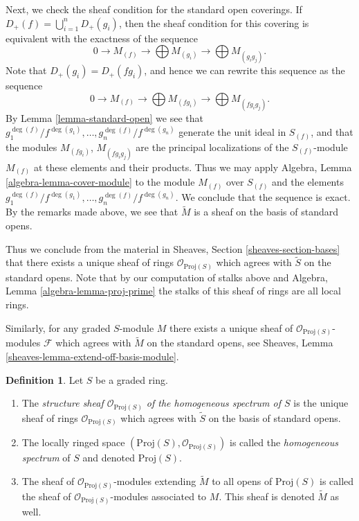 \documentclass{stacks-project}
\theoremstyle{plain}
\theoremstyle{definition}
\newtheorem{definition}[subsection]{Definition}
\theoremstyle{remark}
\numberwithin{equation}{subsection}
\begin{document}
\medskip\noindent
Next, we check the sheaf condition for the standard open coverings.
If $D_{+}(f) = \bigcup_{i = 1}^n D_{+}(g_i)$, then the sheaf condition
for this covering is equivalent with the exactness of the
sequence
$$
0 \to M_{(f)} \to \bigoplus M_{(g_i)} \to \bigoplus M_{(g_ig_j)}.
$$
Note that $D_{+}(g_i) = D_{+}(fg_i)$, and hence we can rewrite this
sequence as the sequence
$$
0 \to M_{(f)} \to \bigoplus M_{(fg_i)} \to \bigoplus M_{(fg_ig_j)}.
$$
By Lemma \ref{lemma-standard-open} we see that
$g_1^{\deg(f)}/f^{\deg(g_1)}, \ldots, g_n^{\deg(f)}/f^{\deg(g_n)}$
generate the unit ideal in $S_{(f)}$, and that the modules
$M_{(fg_i)}$, $M_{(fg_ig_j)}$ are the principal localizations
of the $S_{(f)}$-module $M_{(f)}$ at these elements and their products.
Thus we may apply Algebra, Lemma \ref{algebra-lemma-cover-module}
to the module $M_{(f)}$ over $S_{(f)}$ and the elements
$g_1^{\deg(f)}/f^{\deg(g_1)}, \ldots, g_n^{\deg(f)}/f^{\deg(g_n)}$.
We conclude that the sequence is exact. By the remarks
made above, we see that $\widetilde M$ is a sheaf
on the basis of standard opens.

\medskip\noindent
Thus we conclude from the material in
Sheaves, Section \ref{sheaves-section-bases}
that there exists a
unique sheaf of rings $\mathcal{O}_{\text{Proj}(S)}$
which agrees with $\widetilde S$ on the standard opens.
Note that by our computation of stalks above and
Algebra, Lemma \ref{algebra-lemma-proj-prime} the
stalks of this sheaf of rings are all local rings.

\medskip\noindent
Similarly, for any graded $S$-module $M$ there exists
a unique sheaf of $\mathcal{O}_{\text{Proj}(S)}$-modules
$\mathcal{F}$ which agrees with $\widetilde M$ on the
standard opens, see
Sheaves, Lemma \ref{sheaves-lemma-extend-off-basis-module}.

\begin{definition}
\label{definition-structure-sheaf}
Let $S$ be a graded ring.
\begin{enumerate}
\item The {\it structure sheaf $\mathcal{O}_{\text{Proj}(S)}$ of the
homogeneous spectrum of $S$} is the unique sheaf of rings
$\mathcal{O}_{\text{Proj}(S)}$
which agrees with $\widetilde S$ on the basis of standard opens.
\item The locally ringed space
$(\text{Proj}(S), \mathcal{O}_{\text{Proj}(S)})$ is called
the {\it homogeneous spectrum} of $S$ and denoted $\text{Proj}(S)$.
\item The sheaf of $\mathcal{O}_{\text{Proj}(S)}$-modules
extending $\widetilde M$ to all opens of $\text{Proj}(S)$
is called the sheaf of $\mathcal{O}_{\text{Proj}(S)}$-modules
associated to $M$. This sheaf is denoted $\widetilde M$ as
well.
\end{enumerate}
\end{definition}
\end{document}
